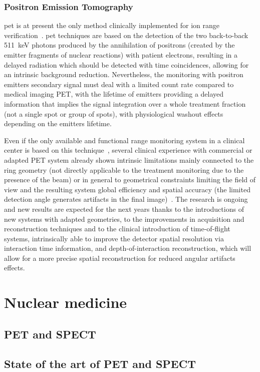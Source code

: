 \subsubsection{Positron Emission Tomography}\label{chap1::subsec::RangePET}
\gls{pet} is at present the only method clinically implemented for ion range verification~\parencite{Hishikawa2002, Enghardt2004, Parodi2007, Bauer2013}. \gls{pet} techniques are based on the detection of the two back-to-back 511~keV photons produced by the annihilation of positrons (created by the emitter fragments of nuclear reactions) with patient electrons, resulting in a delayed radiation which should be detected with time coincidences, allowing for an intrinsic background reduction. Nevertheless, the monitoring with positron emitters secondary signal must deal with a limited count rate compared to medical imaging PET, with the lifetime of emitters providing a delayed information that implies the signal integration over a whole treatment fraction (not a single spot or group of spots), with physiological washout effects depending on the emitters lifetime.

Even if the only available and functional range monitoring system in a clinical center is based on this technique~\parencite{Enghardt2004}, several clinical experience with commercial or adapted PET system already shown intrinsic limitations mainly connected to the ring geometry (not directly applicable to the treatment monitoring due to the presence of the beam) or in general to geometrical constraints limiting the field of view and the resulting system global efficiency and spatial accuracy (the limited detection angle generates artifacts in the final image)~\parencite{Parodi2016}. The research is ongoing and new results are expected for the next years thanks to the introductions of new systems with adapted geometries, to the improvements in acquisition and reconstruction techniques and to the clinical introduction of time-of-flight systems, intrinsically able to improve the detector spatial resolution via interaction time information, and depth-of-interaction reconstruction, which will allow for a more precise spatial reconstruction for reduced angular artifacts effects.






\section{Nuclear medicine}\label{chap1::sec::NuclearMed}


\subsection{PET and SPECT}\label{chap1::subsec::PET-SPECT}


\subsection{State of the art of PET and SPECT}


\clearpage
